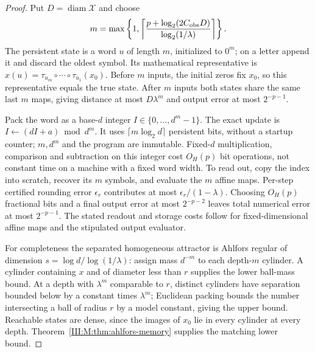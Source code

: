 \begin{proof}
Put $D=\operatorname{diam}\mathcal X$ and choose
\[
 m=\max\left\{1,
 \left\lceil\frac{p+\log_2(2C_{\rm obs}D)}{\log_2(1/\lambda)}
                                      \right\rceil\right\}.
\]
The persistent state is a word $u$ of length $m$, initialized to $0^m$;
on a letter append it and discard the oldest symbol. Its mathematical
representative is $x(u)=\tau_{u_m}\circ\cdots\circ\tau_{u_1}(x_0)$.
Before $m$ inputs, the initial zeros fix $x_0$, so this representative
equals the true state. After $m$ inputs both states share the same
last $m$ maps, giving distance at most $D\lambda^m$ and output
error at most $2^{-p-1}$.

Pack the word as a base-$d$ integer $I\in\{0,\ldots,d^m-1\}$.
The exact update is $I\leftarrow(dI+a)\bmod d^m$.
It uses $\lceil m\log_2d\rceil$ persistent bits, without a startup
counter; $m,d^m$ and the program are immutable. Fixed-$d$ multiplication,
comparison and subtraction on this integer cost $O_H(p)$ bit
operations, not constant time on a machine with a fixed word width.
To read out, copy the index into scratch, recover its $m$ symbols,
and evaluate the $m$ affine maps. Per-step certified rounding error
$\epsilon_r$ contributes at most $\epsilon_r/(1-\lambda)$.
Choosing $O_H(p)$ fractional bits and a final output error at most
$2^{-p-2}$ leaves total numerical error at most $2^{-p-1}$.
The stated readout and storage costs follow for fixed-dimensional
affine maps and the stipulated output evaluator.

For completeness the separated homogeneous attractor is Ahlfors
regular of dimension $s=\log d/\log(1/\lambda)$: assign mass $d^{-m}$
to each depth-$m$ cylinder. A cylinder containing $x$ and of diameter
less than $r$ supplies the lower ball-mass bound. At a depth with
$\lambda^m$ comparable to $r$, distinct cylinders have separation
bounded below by a constant times $\lambda^m$; Euclidean packing
bounds the number intersecting a ball of radius $r$ by a model
constant, giving the upper bound. Reachable states are dense, since
the images of $x_0$ lie in every cylinder at every depth.
Theorem~\ref{III:M:thm:ahlfors-memory} supplies the matching lower bound.
\end{proof}
